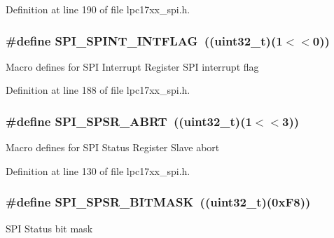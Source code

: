 \-Definition at line 190 of file lpc17xx\-\_\-spi.\-h.

\hypertarget{group___s_p_i___private___macros_ga693ef3111a4fa25c360b5f597958de9b}{
\subsubsection[{\-S\-P\-I\-\_\-\-S\-P\-I\-N\-T\-\_\-\-I\-N\-T\-F\-L\-A\-G}]{\setlength{\rightskip}{0pt plus 5cm}\#define {\bf \-S\-P\-I\-\_\-\-S\-P\-I\-N\-T\-\_\-\-I\-N\-T\-F\-L\-A\-G}~((uint32\-\_\-t)(1$<$$<$0))}}\label{group___s_p_i___private___macros_ga693ef3111a4fa25c360b5f597958de9b}
\-Macro defines for \-S\-P\-I \-Interrupt \-Register \-S\-P\-I interrupt flag 

\-Definition at line 188 of file lpc17xx\-\_\-spi.\-h.

\hypertarget{group___s_p_i___private___macros_gaaf7712834ac27a14993051970e9efddf}{
\subsubsection[{\-S\-P\-I\-\_\-\-S\-P\-S\-R\-\_\-\-A\-B\-R\-T}]{\setlength{\rightskip}{0pt plus 5cm}\#define {\bf \-S\-P\-I\-\_\-\-S\-P\-S\-R\-\_\-\-A\-B\-R\-T}~((uint32\-\_\-t)(1$<$$<$3))}}\label{group___s_p_i___private___macros_gaaf7712834ac27a14993051970e9efddf}
\-Macro defines for \-S\-P\-I \-Status \-Register \-Slave abort 

\-Definition at line 130 of file lpc17xx\-\_\-spi.\-h.

\hypertarget{group___s_p_i___private___macros_ga39bc3aec49ee674a8b0ef281c03ca395}{
\subsubsection[{\-S\-P\-I\-\_\-\-S\-P\-S\-R\-\_\-\-B\-I\-T\-M\-A\-S\-K}]{\setlength{\rightskip}{0pt plus 5cm}\#define {\bf \-S\-P\-I\-\_\-\-S\-P\-S\-R\-\_\-\-B\-I\-T\-M\-A\-S\-K}~((uint32\-\_\-t)(0x\-F8))}}\label{group___s_p_i___private___macros_ga39bc3aec49ee674a8b0ef281c03ca395}
\-S\-P\-I \-Status bit mask 

